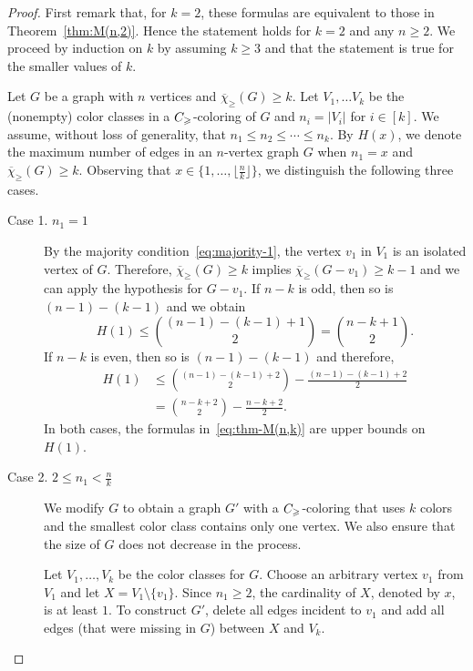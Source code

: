 \documentclass[10pt,a4paper]{amsart}
\newcommand{\cg}{{\rm C}_{\geqslant}}
\newcommand{\mc}{\overline{\chi}_{\geqslant}}
\begin{document}
   \begin{proof}
   First remark that, for $k=2$, these formulas are equivalent to those in Theorem~\ref{thm:M(n,2)}. Hence the statement holds for $k=2$ and any $n \ge 2$. We proceed by induction on $k$ by assuming  $k\ge 3$ and that the statement is true for the smaller values of $k$. 
   
   Let $G$ be a graph with $n$ vertices and $\mc(G) \ge k$. Let $V_1, \dots V_k$ be the (nonempty) color classes in a $\cg$-coloring of $G$ and $n_i=|V_i|$ for $i \in [k]$. We assume, without loss of generality, that $n_1 \leq n_2 \leq \cdots \leq n_k$. By $H(x)$, we denote the maximum number of edges in an $n$-vertex graph $G$ when $n_1=x$ and $\mc(G) \ge k$. Observing that $x \in \{1, \dots , \lfloor \frac{n}{k} \rfloor \}$, we distinguish the following three cases. 
   \begin{description}
       \item[Case 1. $n_1=1$] 
       By the majority condition~\eqref{eq:majority-1}, the vertex $v_1$ in $V_1$ is an isolated vertex of $G$. Therefore, $\mc(G) \ge k$ implies $\mc(G-v_1) \ge k-1$ and we can apply the hypothesis for $G-v_1$. If $n-k$ is odd, then so is $(n-1)-(k-1)$ and we obtain
       $$H(1) \leq {(n-1)- (k-1) +1 \choose 2}= {n-k+1 \choose 2}.
       $$
       If $n-k$ is even, then so is $(n-1)-(k-1)$ and therefore,
       \begin{align*}
           H(1) &\leq {(n-1)- (k-1) +2 \choose 2}- \frac{(n-1)-(k-1)+2}{2}\\
       &= {n-k+2 \choose 2 }- \frac{n-k+2}{2}.
       \end{align*}
         In both cases, the formulas in~\eqref{eq:thm-M(n,k)} are upper bounds on $H(1)$.  
       \item[Case 2. $2 \leq n_1 <\frac{n}{k}$]  
       We modify $G$ to obtain a graph $G'$ with a $\cg$-coloring that uses $k$ colors and the smallest color class contains only one vertex. We also ensure that the size of $G$ does not decrease in the process.

       Let $V_1, \dots, V_k$ be the color classes for $G$. Choose an arbitrary vertex $v_1$ from $V_1$ and let $X=V_1 \setminus \{v_1\}$. Since $n_1 \ge 2$, the cardinality of $X$, denoted by $x$, is at least $1$. To construct $G'$, delete all edges incident to $v_1$ and add all edges (that were missing in $G$) between $X$ and $V_k$. 


\end{description}
\end{proof}
\end{document}
